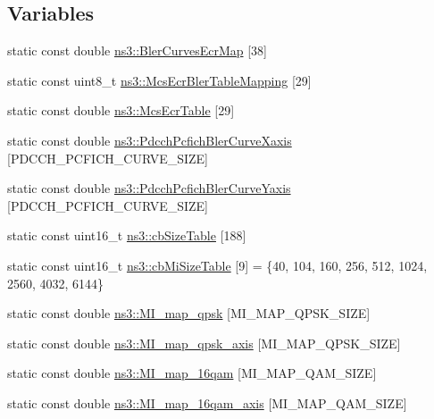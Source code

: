 \subsection*{Variables}
\begin{DoxyCompactItemize}
\item 
static const double \hyperlink{namespacens3_aea9df233b95c667ad4b2249bfb203f64}{ns3\+::\+Bler\+Curves\+Ecr\+Map} \mbox{[}38\mbox{]}
\item 
static const uint8\+\_\+t \hyperlink{namespacens3_ad41f52d74f41546bde1a5d00c1eed016}{ns3\+::\+Mcs\+Ecr\+Bler\+Table\+Mapping} \mbox{[}29\mbox{]}
\item 
static const double \hyperlink{namespacens3_a5e80c75db664b51189d262e55aba06be}{ns3\+::\+Mcs\+Ecr\+Table} \mbox{[}29\mbox{]}
\item 
static const double \hyperlink{namespacens3_a0df485462fa037261fab008e59dea088}{ns3\+::\+Pdcch\+Pcfich\+Bler\+Curve\+Xaxis} \mbox{[}P\+D\+C\+C\+H\+\_\+\+P\+C\+F\+I\+C\+H\+\_\+\+C\+U\+R\+V\+E\+\_\+\+S\+I\+ZE\mbox{]}
\item 
static const double \hyperlink{namespacens3_a1e7d2a19aa596368f6e08d06a2cbe06f}{ns3\+::\+Pdcch\+Pcfich\+Bler\+Curve\+Yaxis} \mbox{[}P\+D\+C\+C\+H\+\_\+\+P\+C\+F\+I\+C\+H\+\_\+\+C\+U\+R\+V\+E\+\_\+\+S\+I\+ZE\mbox{]}
\item 
static const uint16\+\_\+t \hyperlink{namespacens3_a14a1917c5d5a089d32d5d29e3c380ab9}{ns3\+::cb\+Size\+Table} \mbox{[}188\mbox{]}
\item 
static const uint16\+\_\+t \hyperlink{namespacens3_a466a5fd8f869eb3630151a510d79c5e0}{ns3\+::cb\+Mi\+Size\+Table} \mbox{[}9\mbox{]} = \{40, 104, 160, 256, 512, 1024, 2560, 4032, 6144\}
\item 
static const double \hyperlink{namespacens3_a033a4853fbafa2f0685cfc40fafedac1}{ns3\+::\+M\+I\+\_\+map\+\_\+qpsk} \mbox{[}M\+I\+\_\+\+M\+A\+P\+\_\+\+Q\+P\+S\+K\+\_\+\+S\+I\+ZE\mbox{]}
\item 
static const double \hyperlink{namespacens3_a8170078bba1537f2165fdd97e9a49d0f}{ns3\+::\+M\+I\+\_\+map\+\_\+qpsk\+\_\+axis} \mbox{[}M\+I\+\_\+\+M\+A\+P\+\_\+\+Q\+P\+S\+K\+\_\+\+S\+I\+ZE\mbox{]}
\item 
static const double \hyperlink{namespacens3_aafdcfd17fee25ba8ea143f2b73d1791a}{ns3\+::\+M\+I\+\_\+map\+\_\+16qam} \mbox{[}M\+I\+\_\+\+M\+A\+P\+\_\+Q\+A\+M\+\_\+\+S\+I\+ZE\mbox{]}
\item 
static const double \hyperlink{namespacens3_a57654bbd0e78a79e8e20a7af14abe6c4}{ns3\+::\+M\+I\+\_\+map\+\_\+16qam\+\_\+axis} \mbox{[}M\+I\+\_\+\+M\+A\+P\+\_\+Q\+A\+M\+\_\+\+S\+I\+ZE\mbox{]}

\end{DoxyCompactItemize}

